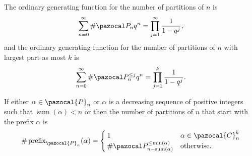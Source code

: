 \begin{lemma}
  The ordinary generating function for the number of partitions of $n$ is \begin{equation}
    \sum_{n=0}^\infty \#\pazocal P_n q^n = \prod_{j=1}^\infty \frac{1}{1-q^j},
  \end{equation}
  and the ordinary generating function for the number of partitions of $n$ with largest part
  as most $k$ is \begin{equation}
    \sum_{n=0}^\infty \#\pazocal P_n^{\leq j} q^n = \prod_{j=1}^k \frac{1}{1-q^j}.
  \end{equation}
\end{lemma}

\begin{proposition}
  If either $\alpha \in \pazocal{P}_n$ or $\alpha$ is
  a decreasing sequence of positive integers such that
  ${\operatorname{sum}(\alpha) < n}$ or
  then the number of partitions of $n$ that start with the prefix $\alpha$
  is \begin{equation}
    \#\operatorname{prefix}_{\pazocal{P}_n}(\alpha) = \begin{cases}
      1 & \alpha \in \pazocal{C}_n^{k} \\
      \#\pazocal P_{n-\operatorname{sum}(\alpha)}^{\leq \operatorname{min}(\alpha)} & \text{otherwise}.
    \end{cases}
  \end{equation}
\end{proposition}
